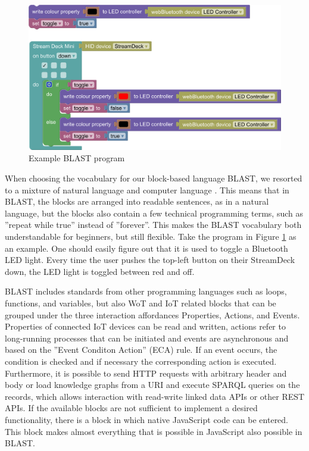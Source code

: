 \documentclass[runningheads]{llncs}
\begin{document}
\begin{figure}
\includegraphics[width=\textwidth]{screenshot.png}%
\caption{Example BLAST program} \label{fig1}
\end{figure}

When choosing the vocabulary for our block-based language BLAST, we resorted to a mixture of natural language and computer language \cite{8120404}.
This means that in BLAST, the blocks are arranged into readable sentences, as in a natural language, but the blocks also contain a few technical programming terms, such as ''repeat while true'' instead of ''forever''.
This makes the BLAST vocabulary both understandable for beginners, but still flexible. Take the program in Figure \ref{fig1} as an example. One should easily figure out that it is used to toggle a Bluetooth LED light. Every time the user pushes the top-left button on their StreamDeck down, the LED light is toggled between red and off.

BLAST includes standards from other programming languages such as loops, functions, and variables, but also WoT and IoT related blocks that can be grouped under the three interaction affordances Properties, Actions, and Events.
Properties of connected IoT devices can be read and written, actions refer to long-running processes that can be initiated and events are asynchronous and based on the ''Event Conditon Action'' (ECA) rule.
If an event occurs, the condition is checked and if necessary the corresponding action is executed.
Furthermore, it is possible to send HTTP requests with arbitrary header and body or load knowledge graphs from a URI and execute SPARQL queries on the records, which allows interaction with read-write linked data APIs or other REST APIs.
If the available blocks are not sufficient to implement a desired functionality, there is a block in which native JavaScript code can be entered.
This block makes almost everything that is possible in JavaScript also possible in BLAST.
\end{document}
